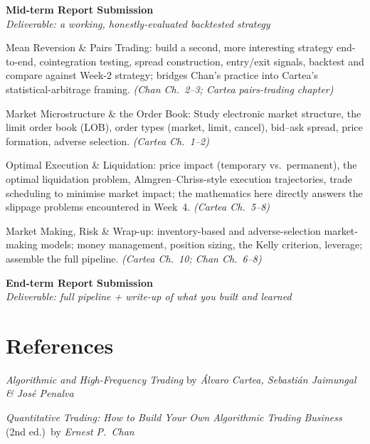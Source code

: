 \documentclass[11pt,a4paper]{article}
\begin{document}
\begin{center}
  \textbf{Mid-term Report Submission}\\
  \textit{\small Deliverable: a working, honestly-evaluated backtested strategy}
\end{center}

\begin{weeklist}

\item[Week 5] Mean Reversion \& Pairs Trading: build a second, more
  interesting strategy end-to-end, cointegration testing, spread
  construction, entry/exit signals, backtest and compare against Week-2
  strategy; bridges Chan's practice into Cartea's statistical-arbitrage
  framing. \textit{(Chan Ch.~2--3; Cartea pairs-trading chapter)}

\item[Week 6] Market Microstructure \& the Order Book: Study electronic market structure,
  the limit order book (LOB), order types (market, limit, cancel), bid--ask
  spread, price formation, adverse selection. \textit{(Cartea Ch.~1--2)}

\item[Week 7] Optimal Execution \& Liquidation: price impact (temporary
  vs.\ permanent), the optimal liquidation problem, Almgren--Chriss-style
  execution trajectories, trade scheduling to minimise market impact; the
  mathematics here directly answers the slippage problems encountered in
  Week~4. \textit{(Cartea Ch.~5--8)}

\item[Week 8] Market Making, Risk \& Wrap-up: inventory-based and
  adverse-selection market-making models; money management, position sizing,
  the Kelly criterion, leverage; assemble the full pipeline. \textit{(Cartea Ch.~10; Chan Ch.~6--8)}

\end{weeklist}

\begin{center}
  \textbf{End-term Report Submission}\\
  \textit{\small Deliverable: full pipeline + write-up of what you built and learned}
\end{center}

\bigskip

\section{References}

\textit{Algorithmic and High-Frequency Trading} by
\textit{\'Alvaro Cartea, Sebasti\'an Jaimungal \& Jos\'e Penalva}

\medskip

\textit{Quantitative Trading: How to Build Your Own Algorithmic Trading
Business} (2nd ed.)\ by \textit{Ernest P.\ Chan}
\end{document}
